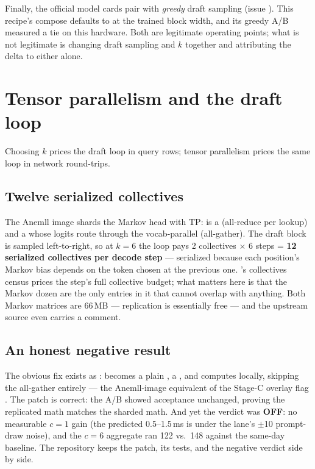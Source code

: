 Finally, the official model cards pair  with
\emph{greedy} draft sampling (issue ). This recipe's compose
defaults to  at the trained block width, and its greedy
A/B measured a tie on this hardware. Both are legitimate operating points;
what is not legitimate is changing draft sampling and $k$ together and
attributing the delta to either alone.

\section{Tensor parallelism and the draft loop}
\label{sec:specdecode-tp}

Choosing $k$ prices the draft loop in query rows; tensor parallelism prices
the same loop in network round-trips.

\subsection{Twelve serialized collectives}

The Anemll image shards the Markov head with TP:  is a
 (all-reduce per lookup) and  a
 whose logits route through the vocab-parallel
 (all-gather). The draft block is sampled
left-to-right, so at $k{=}6$ the loop pays 2 collectives $\times$ 6 steps =
\textbf{12 serialized collectives per decode step} --- serialized because
each position's Markov bias depends on the token chosen at the previous one.
's collectives census prices the step's full collective
budget; what matters here is that the Markov dozen are the only entries in
it that cannot overlap with anything. Both Markov matrices are 66\,MB ---
replication is essentially free --- and the upstream source even carries a
 comment.

\subsection{An honest negative result}

The obvious fix exists as
:
 becomes a plain ,  a
, and  computes locally, skipping the
 all-gather entirely --- the Anemll-image equivalent
of the Stage-C overlay flag
. The
patch is correct: the A/B showed acceptance unchanged, proving the replicated
math matches the sharded math. And yet the verdict was \textbf{OFF}: no
measurable $c{=}1$ gain (the predicted 0.5--1.5\,ms is under the lane's
$\pm$10 \tokspersec{} prompt-draw noise), and the $c{=}6$ aggregate ran 122 vs.\
148 \tokspersec{} against the same-day baseline. The repository keeps the patch, its
tests, and the negative verdict side by side.


